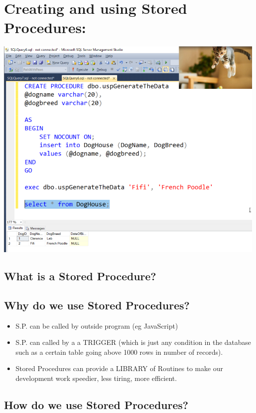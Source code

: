 \newpage
\section {Creating and using Stored Procedures:}
\includegraphics[scale=0.7]{images/RunningStoredProcedures.png}
\subsection {What is a Stored Procedure?}


\subsection{Why do we use Stored Procedures?}


\begin{itemize}
    \item S.P. can be called by outside program (eg JavaScript)
    \item S.P. can called by a a TRIGGER (which is just any condition in the database
    such as a certain table going above 1000 rows in number of records).
    \item Stored Procedures can provide a LIBRARY of Routines to make our development
    work speedier, less tiring, more efficient.
\end{itemize}

\subsection{How do we use Stored Procedures?}

